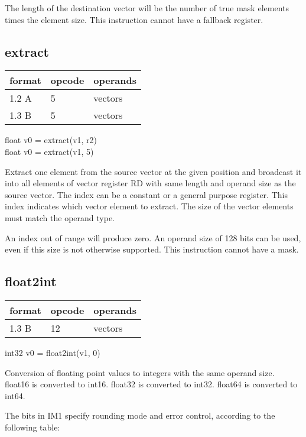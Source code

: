 \documentclass[forwardcom.tex]{subfiles}
\begin{document}
\vv
The length of the destination vector will be the number of true mask elements
times the element size. This instruction cannot have a fallback register.
\vv


\subsection{extract}
\label{table:extractInstruction}
\begin{tabular}{|p{12mm}|p{15mm}|p{100mm}|}
\hline
\bfseries format & \bfseries opcode & \bfseries operands \\ \hline
1.2 A &  5 & vectors  \\ \hline
1.3 B &  5 & vectors  \\ \hline
\end{tabular}
\vv

float v0 = extract(v1, r2)\\
float v0 = extract(v1, 5)
\vv

Extract one element from the source vector at the given position and 
broadcast it into all elements of vector register RD with same length and operand size as the source vector. 
The index can be a constant or a general purpose register. 
This index indicates which vector element to extract. 
The size of the vector elements must match the operand type. 
\vv

An index out of range will produce zero. An operand size of 128 bits can be used, even if this size is not otherwise supported. 
This instruction cannot have a mask.
\vv


\subsection{float2int}
\label{table:float2intInstruction}
\begin{tabular}{|p{12mm}|p{15mm}|p{100mm}|}
\hline
\bfseries format & \bfseries opcode & \bfseries operands \\ \hline
1.3 B & 12 & vectors  \\ \hline
\end{tabular}
\vv

int32 v0 = float2int(v1, 0)
\vv

Conversion of floating point values to integers with the same operand size.\\ 
float16 is converted to int16. float32 is converted to int32. float64 is converted to int64.
\vv

The bits in IM1 specify rounding mode and error control, according to the following table:
\vv
\end{document}
